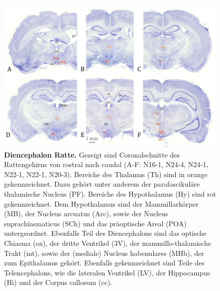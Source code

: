 \begin{figure}[H]
	    \centering
	    \includegraphics[width=0.99\textwidth]{pictures/Bilder_Jule/Ratte/hypothalamus.png}
	    \caption[Diencephalon Ratte]{\textbf{Diencephalon Ratte.} Gezeigt sind Coronalschnitte des Rattengehirns von rostral nach caudal (A-F: N16-1, N24-4, N24-1, N22-1, N22-1, N20-3). Bereiche des Thalamus (Th) sind in orange gekennzeichnet. Dazu gehört unter anderem der parafascikuläre thalamische Nucleus (PF). Bereiche des Hypothalamus (Hy) sind rot gekennzeichnet. Dem Hypothalamus sind der Mammillarkörper (MB), der Nucleus arcuatus (Arc), sowie der Nucleus suprachiasmaticus (SCh) und das präoptische Areal (POA) untergeordnet. Ebenfalls Teil des Diencephalons sind das optische Chiasma (ox), der dritte Ventrikel (3V), der mammillo-thalamische Trakt (mt), sowie der (mediale) Nucleus habenulares (MHb), der zum Epithalamus gehört. Ebenfalls gekennzeichnet sind Teile des Telencephalons, wie die lateralen Ventrikel (LV), der Hippocampus (Hi) und der Corpus callosum (cc).}
	    \label{fig:Diencephalon_Ratte}
\end{figure}{}
